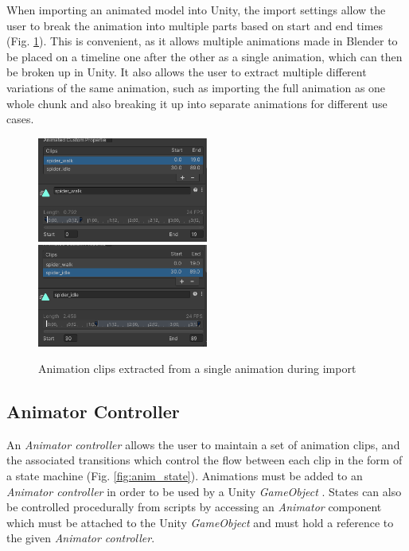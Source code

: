 When importing an animated model into Unity, the import settings allow the user
to break the animation into multiple parts based on start and end times (Fig.
\ref{fig:anim_chunk}). This is convenient, as it allows multiple animations made
in Blender to be placed on a timeline one after the other as a single
animation, which can then be broken up in Unity. It also allows the user to
extract multiple different variations of the same animation, such as importing
the full animation as one whole chunk and also breaking it up into separate
animations for different use cases.

\begin{figure}
    \includegraphics[width=0.5\textwidth]{grafika/animation_chunk_1.png}
    \includegraphics[width=0.5\textwidth]{grafika/animation_chunk_2.png}
    \caption{Animation clips extracted from a single animation during import}
    \label{fig:anim_chunk}
\end{figure}

\subsection{Animator Controller}
An \textit{Animator controller} allows the user to maintain a set of animation
clips, and the associated transitions which control the flow between each clip
in the form of a state machine (Fig. \ref{fig:anim_state}). Animations must be
added to an \textit{Animator controller} in order to be used by a Unity
\textit{GameObject} \cite{unity_animator}. States can also be controlled
procedurally from scripts by accessing an \textit{Animator} component which must
be attached to the Unity \textit{GameObject} and must hold a reference to the
given \textit{Animator controller}.
 
